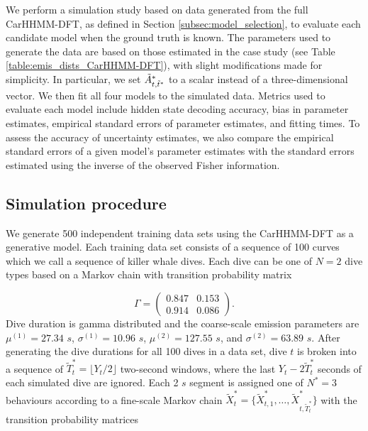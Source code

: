 
We perform a simulation study based on data generated from the full CarHHMM-DFT, as defined in Section \ref{subsec:model_selection}, to evaluate each candidate model when the ground truth is known. The parameters used to generate the data are based on those estimated in the case study (see Table \ref{table:emis_dists_CarHHMM-DFT}), with slight modifications made for simplicity. In particular, we set $\tilde{A}^*_{t,\tilde t^*}$ to a scalar instead of a three-dimensional vector. We then fit all four models to the simulated data. Metrics used to evaluate each model include hidden state decoding accuracy, bias in parameter estimates, empirical standard errors of parameter estimates, and fitting times. To assess the accuracy of uncertainty estimates, we also compare the empirical standard errors of a given model's parameter estimates with the standard errors estimated using the inverse of the observed Fisher information.

\subsection{Simulation procedure}
\label{subsec:data_simulation}

We generate 500 independent training data sets using the CarHHMM-DFT as a generative model. Each training data set consists of a sequence of 100 curves which we call a sequence of killer whale dives. Each dive can be one of $N=2$ dive types based on a Markov chain with transition probability matrix

\[\Gamma = \begin{pmatrix} 0.847 & 0.153 \\ 0.914 & 0.086 \end{pmatrix}.\]
%
Dive duration is gamma distributed and the coarse-scale emission parameters are $\mu^{(1)} = 27.34$ $s$, $\sigma^{(1)} = 10.96$ $s$, $\mu^{(2)} = 127.55$ $s$, and $\sigma^{(2)} = 63.89$ $s$.
%
After generating the dive durations for all 100 dives in a data set, dive $t$ is broken into a sequence of $\tilde T^*_t = \lfloor Y_t/2 \rfloor$ two-second windows, where the last $Y_t - 2 \tilde T^*_t$ seconds of each simulated dive are ignored. Each 2 $s$ segment is assigned one of $N^*=3$ behaviours according to a fine-scale Markov chain $\tilde X^*_t = \big\{\tilde X^*_{t,1}, \ldots, \tilde X^*_{t,\tilde T^*_t} \big\}$ with the transition probability matrices

